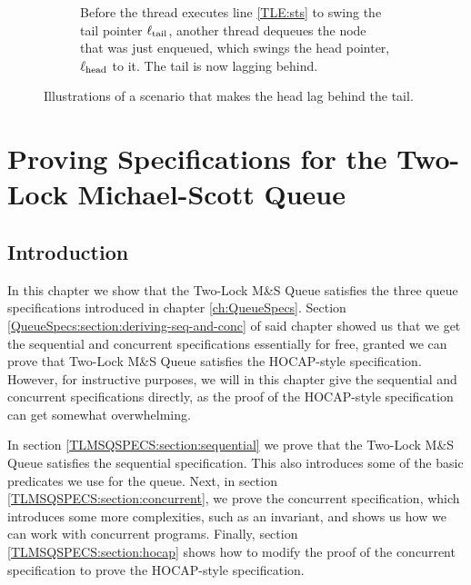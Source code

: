 \documentclass[a4paper, 10pt]{report}
\theoremstyle{definition}
\newcommand{\msq}{M\&S Queue}
\newcommand{\tlmsq}{Two-Lock \msq{}}
\newcommand{\locN}[1]{\loc_{\mathrm{#1}}}
\newcommand{\lochead}{\locN{head}}
\newcommand{\loctail}{\locN{tail}}
\newcommand{\node}{x}
\begin{document}
\begin{figure}
\begin{subfigure}{\textwidth}
\begin{adjustbox}{center}
    \end{adjustbox}
    \caption{Before the thread executes line \ref{TLE:sts} to swing the tail pointer $\loctail$, another thread dequeues the node that was just enqueued, which swings the head pointer, $\lochead$ to it. The tail is now lagging behind.}
    \label{TLMSQ:impl:figure:lag:c}
  \end{subfigure}
  \caption{Illustrations of a scenario that makes the head lag behind the tail.}
  \label{TLMSQ:impl:figure:lag}
\end{figure}


\chapter{Proving Specifications for the Two-Lock Michael-Scott Queue}
\label{ch:TLMSQSPECS}

\section{Introduction}
\label{TLMSQSPECS:section:introduction}

In this chapter we show that the \tlmsq{} satisfies the three queue specifications introduced in chapter \ref{ch:QueueSpecs}. Section \ref{QueueSpecs:section:deriving-seq-and-conc} of said chapter showed us that we get the sequential and concurrent specifications essentially for free, granted we can prove that \tlmsq{} satisfies the HOCAP-style specification. However, for instructive purposes, we will in this chapter give the sequential and concurrent specifications directly, as the proof of the HOCAP-style specification can get somewhat overwhelming.

In section \ref{TLMSQSPECS:section:sequential} we prove that the \tlmsq{} satisfies the sequential specification. This also introduces some of the basic predicates we use for the queue. Next, in section \ref{TLMSQSPECS:section:concurrent}, we prove the concurrent specification, which introduces some more complexities, such as an invariant, and shows us how we can work with concurrent programs. Finally, section \ref{TLMSQSPECS:section:hocap} shows how to modify the proof of the concurrent specification to prove the HOCAP-style specification.
\end{document}
